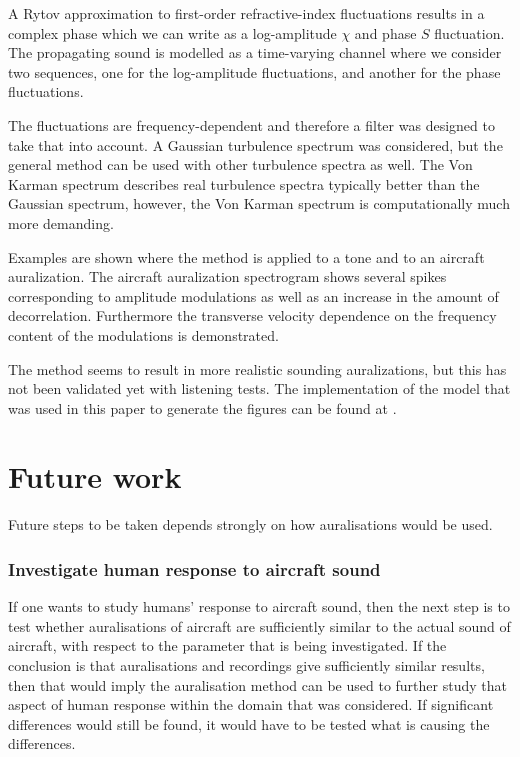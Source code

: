A Rytov approximation to first-order refractive-index fluctuations results in a complex
phase which we can write as a log-amplitude $\chi$ and phase $S$ fluctuation.
The propagating sound is modelled as a time-varying channel where we consider
two sequences, one for the log-amplitude fluctuations, and another for the phase
fluctuations.

The fluctuations are frequency-dependent and therefore a filter was designed to take that into account.
A Gaussian turbulence spectrum was considered, but the general method can be
used with other turbulence spectra as well. The Von Karman spectrum describes
real turbulence spectra typically better than the Gaussian spectrum, however,
the Von Karman spectrum is computationally much more demanding.

Examples are shown where the method is applied to a tone and to an aircraft
auralization. The aircraft auralization spectrogram shows several spikes
corresponding to amplitude modulations as well as an increase in the amount of
decorrelation. Furthermore the transverse velocity dependence on the frequency
content of the modulations is demonstrated.

The method seems to result in more realistic sounding
auralizations, but this has not been validated yet with listening tests. The
implementation of the model that was used in this paper to generate the figures
can be found at \cite{Rietdijk2016}.

\section{Future work}
Future steps to be taken depends strongly on how auralisations would
be used.

\subsubsection*{Investigate human response to aircraft sound}
If one wants to study humans' response to aircraft sound, then the next step is
to test whether auralisations of aircraft are sufficiently similar to the actual
sound of aircraft, with respect to the parameter that is being investigated. If
the conclusion is that auralisations and recordings give sufficiently similar
results, then that would imply the auralisation method can be used to further
study that aspect of human response within the domain that was considered. If
significant differences would still be found, it would have to be tested what is
causing the differences.

